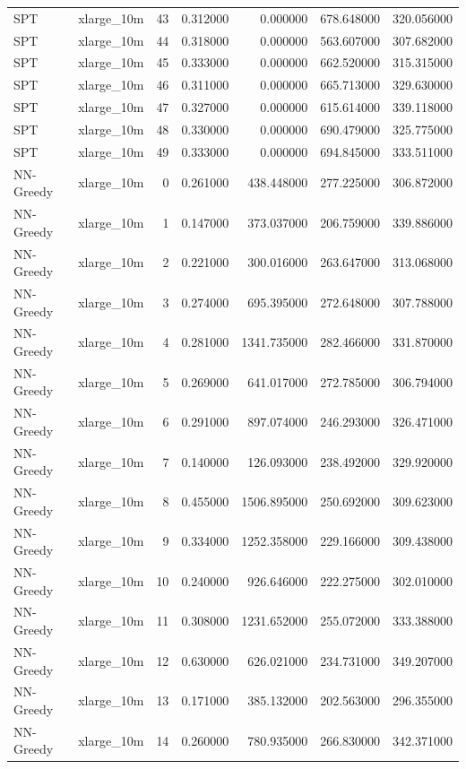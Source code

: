 \begin{tabular}{llrrrrr}
SPT & xlarge_10m & 43 & 0.312000 & 0.000000 & 678.648000 & 320.056000 \\
SPT & xlarge_10m & 44 & 0.318000 & 0.000000 & 563.607000 & 307.682000 \\
SPT & xlarge_10m & 45 & 0.333000 & 0.000000 & 662.520000 & 315.315000 \\
SPT & xlarge_10m & 46 & 0.311000 & 0.000000 & 665.713000 & 329.630000 \\
SPT & xlarge_10m & 47 & 0.327000 & 0.000000 & 615.614000 & 339.118000 \\
SPT & xlarge_10m & 48 & 0.330000 & 0.000000 & 690.479000 & 325.775000 \\
SPT & xlarge_10m & 49 & 0.333000 & 0.000000 & 694.845000 & 333.511000 \\
NN-Greedy & xlarge_10m & 0 & 0.261000 & 438.448000 & 277.225000 & 306.872000 \\
NN-Greedy & xlarge_10m & 1 & 0.147000 & 373.037000 & 206.759000 & 339.886000 \\
NN-Greedy & xlarge_10m & 2 & 0.221000 & 300.016000 & 263.647000 & 313.068000 \\
NN-Greedy & xlarge_10m & 3 & 0.274000 & 695.395000 & 272.648000 & 307.788000 \\
NN-Greedy & xlarge_10m & 4 & 0.281000 & 1341.735000 & 282.466000 & 331.870000 \\
NN-Greedy & xlarge_10m & 5 & 0.269000 & 641.017000 & 272.785000 & 306.794000 \\
NN-Greedy & xlarge_10m & 6 & 0.291000 & 897.074000 & 246.293000 & 326.471000 \\
NN-Greedy & xlarge_10m & 7 & 0.140000 & 126.093000 & 238.492000 & 329.920000 \\
NN-Greedy & xlarge_10m & 8 & 0.455000 & 1506.895000 & 250.692000 & 309.623000 \\
NN-Greedy & xlarge_10m & 9 & 0.334000 & 1252.358000 & 229.166000 & 309.438000 \\
NN-Greedy & xlarge_10m & 10 & 0.240000 & 926.646000 & 222.275000 & 302.010000 \\
NN-Greedy & xlarge_10m & 11 & 0.308000 & 1231.652000 & 255.072000 & 333.388000 \\
NN-Greedy & xlarge_10m & 12 & 0.630000 & 626.021000 & 234.731000 & 349.207000 \\
NN-Greedy & xlarge_10m & 13 & 0.171000 & 385.132000 & 202.563000 & 296.355000 \\
NN-Greedy & xlarge_10m & 14 & 0.260000 & 780.935000 & 266.830000 & 342.371000 \\

\end{tabular}
